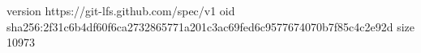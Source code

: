 version https://git-lfs.github.com/spec/v1
oid sha256:2f31c6b4df60f6ca2732865771a201c3ac69fed6c9577674070b7f85c4c2e92d
size 10973
